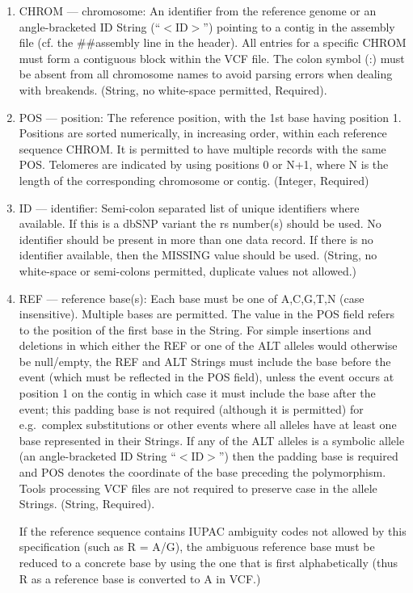 \documentclass[8pt]{article}
\begin{document}
\begin{enumerate}
  \item CHROM --- chromosome: An identifier from the reference genome or an angle-bracketed ID String (``$<$ID$>$'') pointing to a contig in the assembly file (cf. the \#\#assembly line in the header).
  All entries for a specific CHROM must form a contiguous block within the VCF file.
  The colon symbol (:) must be absent from all chromosome names to avoid parsing errors when dealing with breakends.
  (String, no white-space permitted, Required).
  \item POS --- position: The reference position, with the 1st base having position 1.
  Positions are sorted numerically, in increasing order, within each reference sequence CHROM.
  It is permitted to have multiple records with the same POS.
  Telomeres are indicated by using positions 0 or N+1, where N is the length of the corresponding chromosome or contig.
  (Integer, Required)
  \item ID --- identifier: Semi-colon separated list of unique identifiers where available.
  If this is a dbSNP variant the rs number(s) should be used.
  No identifier should be present in more than one data record.
  If there is no identifier available, then the MISSING value should be used.
  (String, no white-space or semi-colons permitted, duplicate values not allowed.)
  \item REF --- reference base(s): Each base must be one of A,C,G,T,N (case insensitive).
  Multiple bases are permitted.
  The value in the POS field refers to the position of the first base in the String.
  For simple insertions and deletions in which either the REF or one of the ALT alleles would otherwise be null/empty, the REF and ALT Strings must include the base before the event (which must be reflected in the POS field), unless the event occurs at position 1 on the contig in which case it must include the base after the event; \pagebreak[1] this padding base is not required (although it is permitted) for e.g.\ complex substitutions or other events where all alleles have at least one base represented in their Strings.
  If any of the ALT alleles is a symbolic allele (an angle-bracketed ID String ``$<$ID$>$'') then the padding base is required and POS denotes the coordinate of the base preceding the polymorphism.
  Tools processing VCF files are not required to preserve case in the allele Strings. (String, Required).

  If the reference sequence contains IUPAC ambiguity codes not allowed by this specification (such as R = A/G), the ambiguous reference base must be reduced to a concrete base by using the one that is first alphabetically (thus R as a reference base is converted to A in VCF.)


\end{enumerate}
\end{document}

